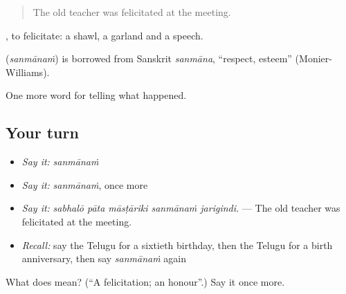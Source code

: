 \begin{quote}
The old teacher was felicitated at the meeting.
\end{quote}

 , to felicitate: a shawl, a garland and a speech.

\begin{cousinweb}
\textbf{} (\emph{sanmānaṁ}) is borrowed from Sanskrit \emph{sanmāna}, \textquotedblleft{}respect, esteem\textquotedblright{} (Monier-Williams).
\end{cousinweb}

\begin{grammarlens}[title={What you've built}]
One more word for telling what happened.
\end{grammarlens}

\subsection*{Your turn}
\begin{itemize}
\raggedright
  \item \emph{Say it:} \emph{sanmānaṁ}
  \item \emph{Say it:} \emph{sanmānaṁ}, once more
  \item \emph{Say it:} \emph{sabhalō pāta māsṭāriki sanmānaṁ jarigindi.} — The old teacher was felicitated at the meeting.
  \item \emph{Recall:} say the Telugu for a sixtieth birthday, then the Telugu for a birth anniversary, then say \emph{sanmānaṁ} again
\end{itemize}

\begin{tcolorbox}[breakable,colback=teal!4,colframe=teal!35!black,title={Before you move on}]
What does  mean? (\textquotedblleft{}A felicitation; an honour\textquotedblright{}.) Say it once more.
\end{tcolorbox}
